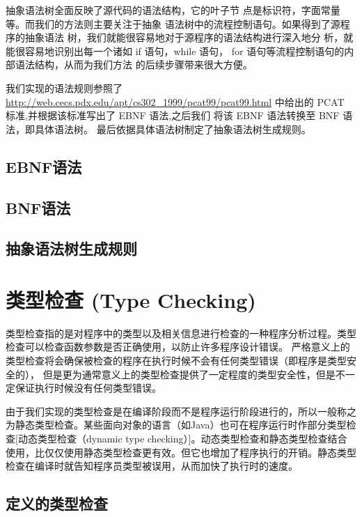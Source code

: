 ﻿\documentclass{article}
\begin{document}
抽象语法树全面反映了源代码的语法结构，它的叶子节
点是标识符，字面常量等。而我们的方法则主要关注于抽象
语法树中的流程控制语句。如果得到了源程序的抽象语法
树，我们就能很容易地对于源程序的语法结构进行深入地分
析，就能很容易地识别出每一个诸如 if 语句，while 语句，
for 语句等流程控制语句的内部语法结构，从而为我们方法
的后续步骤带来很大方便。 

我们实现的语法规则参照了 
\url{http://web.cecs.pdx.edu/apt/cs302_1999/pcat99/pcat99.html}
中给出的 PCAT 标准,并根据该标准写出了 EBNF 语法,之后我们
将该 EBNF 语法转换至 BNF 语法，即具体语法树。
最后依据具体语法树制定了抽象语法树生成规则。

\subsection{EBNF语法}  

\subsection{BNF语法}  

\subsection{抽象语法树生成规则}


\section{类型检查 (Type Checking)}

类型检查指的是对程序中的类型以及相关信息进行检查的一种程序分析过程。类型检查可以检查函数参数是否正确使用，以防止许多程序设计错误。
严格意义上的类型检查将会确保被检查的程序在执行时候不会有任何类型错误（即程序是类型安全的），
但是更为通常意义上的类型检查提供了一定程度的类型安全性，但是不一定保证执行时候没有任何类型错误。

由于我们实现的类型检查是在编译阶段而不是程序运行阶段进行的，所以一般称之为静态类型检查。某些面向对象的语言（如Java）也可在程序运行时作部分类型检查[动态类型检查（dynamic type checking）]。动态类型检查和静态类型检查结合使用，比仅仅使用静态类型检查更有效。但它也增加了程序执行的开销。静态类型检查在编译时就告知程序员类型被误用，从而加快了执行时的速度。

\subsection{定义的类型检查}
\end{document}
